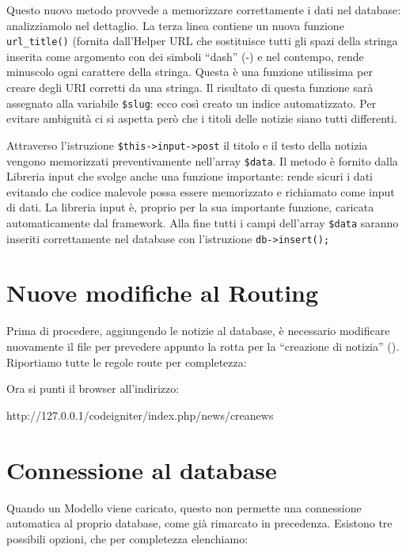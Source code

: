 Questo nuovo metodo provvede a memorizzare correttamente i dati nel database: analizziamolo nel dettaglio. La terza linea contiene un nuova funzione \verb|url_title()| (fornita dall'Helper URL \pageref{helper:url)} che sostituisce tutti gli spazi della stringa inserita come argomento con dei simboli ``dash'' (-) e nel contempo, rende minuscolo ogni carattere della stringa. Questa è una funzione utilissima per creare degli \ac{URI} corretti da una stringa. Il risultato di questa funzione sarà assegnato alla variabile \verb|$slug|: ecco così creato un indice automatizzato. Per evitare ambiguità ci si aspetta però che i titoli delle notizie siano tutti differenti.

Attraverso l'istruzione \verb|$this->input->post| il titolo e il testo della notizia vengono memorizzati preventivamente nell'array \verb|$data|. Il metodo  è fornito dalla Libreria input che svolge anche una funzione importante: rende sicuri i dati evitando che codice malevole possa essere memorizzato e richiamato come input di dati. La libreria input è, proprio per la sua importante funzione, caricata automaticamente dal framework. Alla fine tutti i campi dell'array \verb|$data| saranno inseriti correttamente nel database con l'istruzione \verb|db->insert();|

\section*{Nuove modifiche al Routing}
Prima di procedere, aggiungendo le notizie al database, è necessario modificare nuovamente il file  per prevedere appunto la rotta per la ``creazione di notizia'' (). Riportiamo tutte le regole route per completezza:


Ora si punti il browser all'indirizzo:

\begin{code}
http://127.0.0.1/codeigniter/index.php/news/creanews
\end{code}

\label{sec:accessodb}
\section*{Connessione al database}
Quando un Modello viene caricato, questo non permette una connessione automatica al proprio database, come già rimarcato in precedenza. Esistono tre possibili opzioni, che per completezza elenchiamo:


